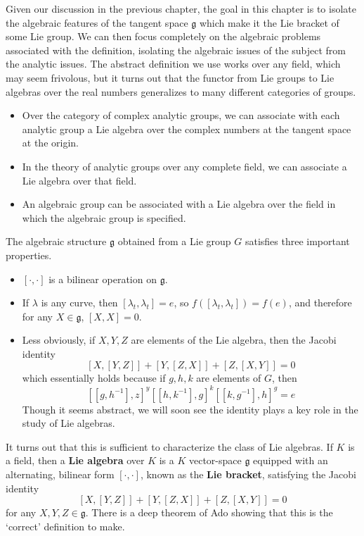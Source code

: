 Given our discussion in the previous chapter, the goal in this chapter is to isolate the algebraic features of the tangent space $\mathfrak{g}$ which make it the Lie bracket of some Lie group. We can then focus completely on the algebraic problems associated with the definition, isolating the algebraic issues of the subject from the analytic issues. The abstract definition we use works over any field, which may seem frivolous, but it turns out that the functor from Lie groups to Lie algebras over the real numbers generalizes to many different categories of groups.
%
\begin{itemize}
    \item Over the category of complex analytic groups, we can associate with each analytic group a Lie algebra over the complex numbers at the tangent space at the origin.

    \item In the theory of analytic groups over any complete field, we can associate a Lie algebra over that field.

    \item An algebraic group can be associated with a Lie algebra over the field in which the algebraic group is specified.
\end{itemize}
%
The algebraic structure $\mathfrak{g}$ obtained from a Lie group $G$ satisfies three important properties.
%
\begin{itemize}
    \item $[\cdot, \cdot]$ is a bilinear operation on $\mathfrak{g}$.
    \item If $\lambda$ is any curve, then $[\lambda_t, \lambda_t] = e$, so $f([\lambda_t, \lambda_t]) = f(e)$, and therefore for any $X \in \mathfrak{g}$, $[X,X] = 0$.
    \item Less obviously, if $X,Y,Z$ are elements of the Lie algebra, then the Jacobi identity
    \[ [X,[Y,Z]] + [Y,[Z,X]] + [Z,[X,Y]] = 0 \]
    which essentially holds because if $g,h,k$ are elements of $G$, then
    \[ [[g,h^{-1}],z]^y [[h,k^{-1}],g]^k [[k,g^{-1}], h]^g = e \]
    Though it seems abstract, we will soon see the identity plays a key role in the study of Lie algebras.
\end{itemize}
%
It turns out that this is sufficient to characterize the class of Lie algebras. If $K$ is a field, then a {\bf Lie algebra} over $K$ is a $K$ vector-space $\mathfrak{g}$ equipped with an alternating, bilinear form $[\cdot, \cdot]$, known as the {\bf Lie bracket}, satisfying the Jacobi identity
%
\[ [X,[Y,Z]] + [Y,[Z,X]] + [Z,[X,Y]] = 0 \]
%
for any $X,Y,Z \in \mathfrak{g}$. There is a deep theorem of Ado showing that this is the `correct' definition to make.

